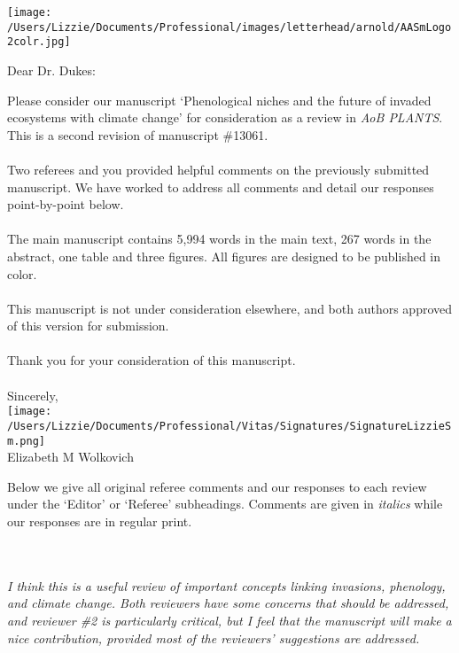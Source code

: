 \documentclass[11pt,a4paper]{letter}
\begin{document}
\thispagestyle{empty}
\begin{letter}{}
\texttt{[image: /Users/Lizzie/Documents/Professional/images/letterhead/arnold/AASmLogo2colr.jpg]}
\renewcommand{\refname}{\CHead{Literature Cited}}


\opening{Dear Dr. Dukes:}

Please consider our manuscript `Phenological niches and the future of invaded ecosystems with climate change' for consideration as a review in \emph{AoB PLANTS}. This is a second revision of manuscript \#13061.\\
\\
Two referees and you provided helpful comments on the previously submitted manuscript. We have worked to address all comments and detail our responses point-by-point below.\\
\\
The main manuscript contains 5,994 words in the main text, 267 words in the abstract, one table and three figures. All figures are designed to be published in color. \\
\\
This manuscript is not under consideration elsewhere, and both authors approved of this version for submission.\\
\\
Thank you for your consideration of this manuscript.\\
\\
Sincerely,
\\
\texttt{[image: /Users/Lizzie/Documents/Professional/Vitas/Signatures/SignatureLizzieSm.png]} 
\\
\noindent Elizabeth M Wolkovich

\newpage
Below we give all original referee comments and our responses to each
review under the `Editor' or `Referee' subheadings. Comments are given in \emph{italics} while
our responses are in regular print. 

\\
\\
\emph{I think this is a useful review of important concepts linking invasions, phenology, and climate change. Both reviewers have some concerns that should be addressed, and reviewer \#2 is particularly critical, but I feel that the manuscript will make a nice contribution, provided most of the reviewers' suggestions are addressed.}


\end{letter}
\end{document}
